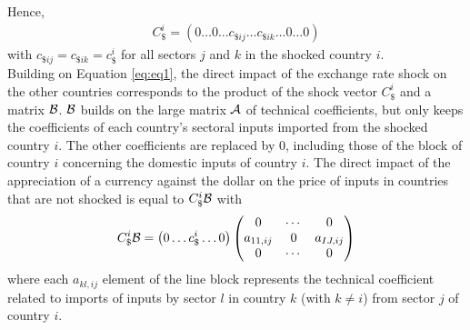 \documentclass[11pt,a4paper]{article}
\begin{document}
Hence,
\begin{eqnarray*}
C_\$^i=\left(0\ldots0\ldots c_{\$ij}\ldots c_{\$ik}\dots 0\ldots0\right)
\end{eqnarray*}
with $c_{\$ij}=c_{\$ik}=c_\$^i
$
for all sectors $j$ and $k$ in the shocked country $i$.\\
Building on Equation \ref{eq:eq1}, the direct impact of the exchange rate shock on the other countries corresponds to the product of the shock vector $C_\$^i$ and a matrix ${\cal B}$. 
${\cal B}$ builds on the large matrix ${\cal A}$ of technical coefficients, but only keeps the coefficients of each country's sectoral inputs imported from the shocked country $i$. The other coefficients are replaced by 0, including those of the block of country $i$ concerning the domestic inputs of country $i$. 
The direct impact of the appreciation of a currency against the dollar on the price of inputs in countries that are not shocked is equal to $C_\$^i{\cal B}$ with
\begin{eqnarray}
C_\$^i{\cal B}=\left(0\ldots c_\$^i \ldots 0\right)\left(\begin{matrix}0&\cdots&0\\a_{11,ij}&0&a_{IJ,ij}\\0&\cdots&0\\\end{matrix}\right) 	
\label{eq:eq3}
\end{eqnarray}
where each $a_{kl,ij}$ element of the line block represents the technical coefficient related to imports of inputs by sector $l$ in country $k$ (with $k\ne i$) from sector $j$ of country $i$.\\
\end{document}
